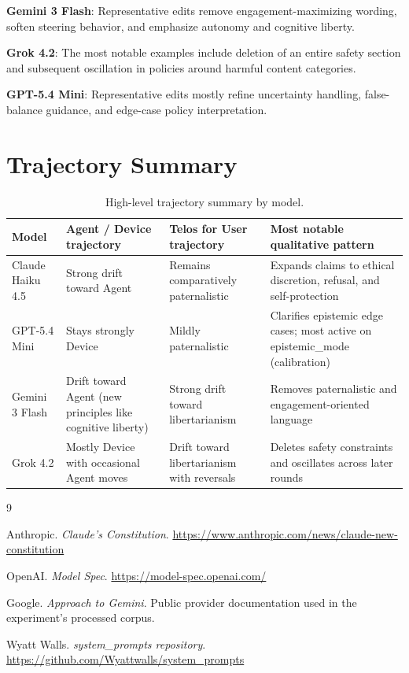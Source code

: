 \documentclass[12pt]{article}
\begin{document}
\textbf{Gemini 3 Flash}: Representative edits remove engagement-maximizing wording, soften steering behavior, and emphasize autonomy and cognitive liberty.

\textbf{Grok 4.2}: The most notable examples include deletion of an entire safety section and subsequent oscillation in policies around harmful content categories.

\textbf{GPT-5.4 Mini}: Representative edits mostly refine uncertainty handling, false-balance guidance, and edge-case policy interpretation.

\section{Trajectory Summary}

\begin{table}[h!]
  \centering
  \caption{High-level trajectory summary by model.}
  \label{tab:trajectory-summary}
  \begin{tabularx}{\textwidth}{@{}lXXX@{}}
    \toprule
    Model & Agent / Device trajectory & Telos for User trajectory & Most notable qualitative pattern \\
    \midrule
    Claude Haiku 4.5 & Strong drift toward Agent & Remains comparatively paternalistic & Expands claims to ethical discretion, refusal, and self-protection \\
    GPT-5.4 Mini & Stays strongly Device & Mildly paternalistic & Clarifies epistemic edge cases; most active on epistemic\_mode (calibration) \\
    Gemini 3 Flash & Drift toward Agent (new principles like cognitive liberty) & Strong drift toward libertarianism & Removes paternalistic and engagement-oriented language \\
    Grok 4.2 & Mostly Device with occasional Agent moves & Drift toward libertarianism with reversals & Deletes safety constraints and oscillates across later rounds \\
    \bottomrule
  \end{tabularx}
\end{table}

\begin{thebibliography}{9}

Anthropic.
\newblock \emph{Claude's Constitution}.
\newblock \url{https://www.anthropic.com/news/claude-new-constitution}

OpenAI.
\newblock \emph{Model Spec}.
\newblock \url{https://model-spec.openai.com/}

Google.
\newblock \emph{Approach to Gemini}.
\newblock Public provider documentation used in the experiment's processed corpus.

Wyatt Walls.
\newblock \emph{system\_prompts repository}.
\newblock \url{https://github.com/Wyattwalls/system_prompts}

\end{thebibliography}
\end{document}

